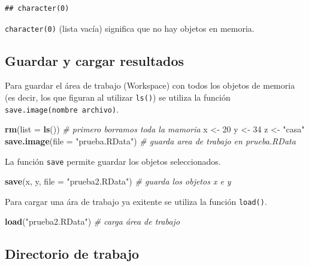 \documentclass[]{book}
\newenvironment{Shaded}{\begin{snugshade}}{\end{snugshade}}
\newcommand{\KeywordTok}[1]{\textcolor[rgb]{0.13,0.29,0.53}{\textbf{#1}}}
\newcommand{\DataTypeTok}[1]{\textcolor[rgb]{0.13,0.29,0.53}{#1}}
\newcommand{\DecValTok}[1]{\textcolor[rgb]{0.00,0.00,0.81}{#1}}
\newcommand{\StringTok}[1]{\textcolor[rgb]{0.31,0.60,0.02}{#1}}
\newcommand{\CommentTok}[1]{\textcolor[rgb]{0.56,0.35,0.01}{\textit{#1}}}
\newcommand{\NormalTok}[1]{#1}
\begin{document}
\begin{verbatim}
## character(0)
\end{verbatim}

\texttt{character(0)} (lista vacía) significa que no hay objetos en
memoria.

\subsection{Guardar y cargar
resultados}\label{guardar-y-cargar-resultados}

Para guardar el área de trabajo (Workspace) con todos los objetos de
memoria (es decir, los que figuran al utilizar \texttt{ls()}) se utiliza
la función \texttt{save.image(nombre\ archivo)}.

\begin{Shaded}
\begin{Highlighting}[]
\KeywordTok{rm}\NormalTok{(}\DataTypeTok{list =} \KeywordTok{ls}\NormalTok{()) }\CommentTok{# primero borramos toda la mamoria}
\NormalTok{x <-}\StringTok{ }\DecValTok{20}
\NormalTok{y <-}\StringTok{ }\DecValTok{34}
\NormalTok{z <-}\StringTok{ "casa"}
\KeywordTok{save.image}\NormalTok{(}\DataTypeTok{file =} \StringTok{"prueba.RData"}\NormalTok{) }\CommentTok{# guarda area de trabajo en prueba.RData}
\end{Highlighting}
\end{Shaded}

La función \texttt{save} permite guardar los objetos seleccionados.

\begin{Shaded}
\begin{Highlighting}[]
\KeywordTok{save}\NormalTok{(x, y, }\DataTypeTok{file =} \StringTok{"prueba2.RData"}\NormalTok{) }\CommentTok{# guarda los objetos x e y}
\end{Highlighting}
\end{Shaded}

Para cargar una ára de trabajo ya exitente se utiliza la función
\texttt{load()}.

\begin{Shaded}
\begin{Highlighting}[]
\KeywordTok{load}\NormalTok{(}\StringTok{"prueba2.RData"}\NormalTok{) }\CommentTok{# carga área de trabajo}
\end{Highlighting}
\end{Shaded}

\subsection{Directorio de trabajo}\label{directorio-de-trabajo}
\end{document}
